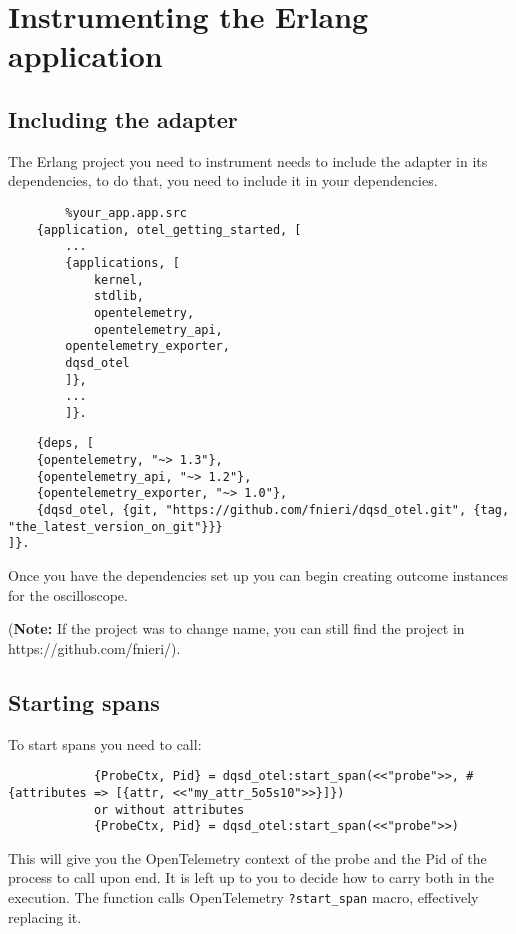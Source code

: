\section{Instrumenting the Erlang application} \label{app:instr_app}
    \subsection{Including the adapter}

    The Erlang project you need to instrument needs to include the adapter in its dependencies, to do that, you need to include it in your dependencies.

    \begin{verbatim}
        %your_app.app.src
    {application, otel_getting_started, [
        ...
        {applications, [
            kernel,
            stdlib,
            opentelemetry,
            opentelemetry_api,
        opentelemetry_exporter,
        dqsd_otel
        ]},
        ...
        ]}.
    \end{verbatim}

    \begin{verbatim}
    {deps, [
    {opentelemetry, "~> 1.3"},
    {opentelemetry_api, "~> 1.2"},
    {opentelemetry_exporter, "~> 1.0"},
    {dqsd_otel, {git, "https://github.com/fnieri/dqsd_otel.git", {tag, "the_latest_version_on_git"}}}
]}.
    \end{verbatim}
    
    Once you have the dependencies set up you can begin creating outcome instances for the oscilloscope.

    (\textbf{Note:} If the project was to change name, you can still find the project in https://github.com/fnieri/).

    \subsection{Starting spans}
        To start spans you need to call: 
        \begin{verbatim}
            {ProbeCtx, Pid} = dqsd_otel:start_span(<<"probe">>, #{attributes => [{attr, <<"my_attr_5o5s10">>}]})
            or without attributes
            {ProbeCtx, Pid} = dqsd_otel:start_span(<<"probe">>)
        \end{verbatim}
        This will give you the OpenTelemetry context of the probe and the Pid of the process to call upon end. It is left up to you to decide how to carry both in the execution.
        The function calls OpenTelemetry \texttt{?start\_span} macro, effectively replacing it.
    
